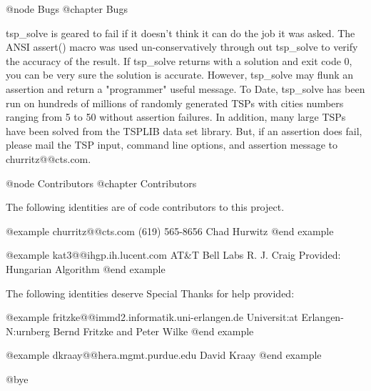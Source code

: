 @node Bugs
@chapter Bugs

tsp_solve is geared to fail if it doesn't think it can do the job it was
asked.  The ANSI assert() macro was used un-conservatively through out
tsp_solve to verify the accuracy of the result.  If tsp_solve returns with
a solution and exit code 0, you can be very sure the solution is accurate.
However, tsp_solve may flunk an assertion and return a "programmer" useful
message.  To Date, tsp_solve has been run on hundreds of millions of randomly
generated TSPs with cities numbers ranging from 5 to 50 without assertion
failures.  In addition, many large TSPs have been solved from the TSPLIB data
set library.  But, if an assertion does fail, please mail the TSP input,
command line options, and assertion message to churritz@@cts.com.

@node Contributors
@chapter Contributors

The following identities are of code contributors to this project.

@example
churritz@@cts.com
(619) 565-8656
Chad Hurwitz
@end example

@example
kat3@@ihgp.ih.lucent.com
AT&T Bell Labs
R. J. Craig
Provided: Hungarian Algorithm
@end example

The following identities deserve Special Thanks for help provided:

@example
fritzke@@immd2.informatik.uni-erlangen.de
Universit:at Erlangen-N:urnberg
Bernd Fritzke and Peter Wilke
@end example

@example
dkraay@@hera.mgmt.purdue.edu
David Kraay
@end example

@bye
